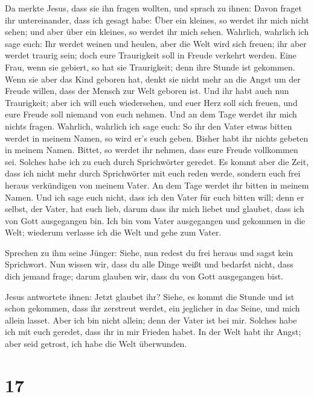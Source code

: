  Da merkte Jesus, dass sie ihn fragen wollten, und sprach
zu ihnen: Davon fraget ihr untereinander, dass ich gesagt habe: Über ein
kleines, so werdet ihr mich nicht sehen; und aber über ein kleines, so
werdet ihr mich sehen.  Wahrlich, wahrlich ich sage euch:
Ihr werdet weinen und heulen, aber die Welt wird sich freuen; ihr aber
werdet traurig sein; doch eure Traurigkeit soll in Freude verkehrt
werden.  Eine Frau, wenn sie gebiert, so hat sie
Traurigkeit; denn ihre Stunde ist gekommen. Wenn sie aber das Kind
geboren hat, denkt sie nicht mehr an die Angst um der Freude willen,
dass der Mensch zur Welt geboren ist.  Und ihr habt auch
nun Traurigkeit; aber ich will euch wiedersehen, und euer Herz soll sich
freuen, und eure Freude soll niemand von euch nehmen. 
Und an dem Tage werdet ihr mich nichts fragen. Wahrlich, wahrlich ich
sage euch: So ihr den Vater etwas bitten werdet in meinem Namen, so wird
er's euch geben.  Bisher habt ihr nichts gebeten in
meinem Namen. Bittet, so werdet ihr nehmen, dass eure Freude vollkommen
sei.  Solches habe ich zu euch durch Sprichwörter
geredet. Es kommt aber die Zeit, dass ich nicht mehr durch Sprichwörter
mit euch reden werde, sondern euch frei heraus verkündigen von meinem
Vater.  An dem Tage werdet ihr bitten in meinem Namen.
Und ich sage euch nicht, dass ich den Vater für euch bitten will;
 denn er selbst, der Vater, hat euch lieb, darum dass ihr
mich liebet und glaubet, dass ich von Gott ausgegangen bin.
 Ich bin vom Vater ausgegangen und gekommen in die Welt;
wiederum verlasse ich die Welt und gehe zum Vater.

 Sprechen zu ihm seine Jünger: Siehe, nun redest du frei
heraus und sagst kein Sprichwort.  Nun wissen wir, dass
du alle Dinge weißt und bedarfst nicht, dass dich jemand frage; darum
glauben wir, dass du von Gott ausgegangen bist.

 Jesus antwortete ihnen: Jetzt glaubet ihr?
 Siehe, es kommt die Stunde und ist schon gekommen, dass
ihr zerstreut werdet, ein jeglicher in das Seine, und mich allein
lasset. Aber ich bin nicht allein; denn der Vater ist bei mir.
 Solches habe ich mit euch geredet, dass ihr in mir
Frieden habet. In der Welt habt ihr Angst; aber seid getrost, ich habe
die Welt überwunden.

\hypertarget{section-16}{%
\section{17}\label{section-16}}

